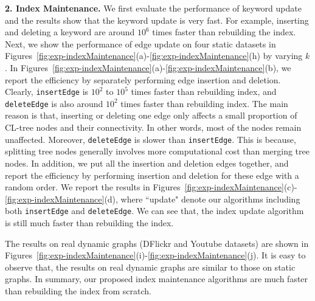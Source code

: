 {\color{blue}
\textbf{2. Index Maintenance.}
We first evaluate the performance of keyword update and the results show that the keyword update is very fast. For example, inserting and deleting a keyword are around $10^6$ times faster than rebuilding the index.
Next, we show the performance of edge update on four static datasets in Figures~\ref{fig:exp-indexMaintenance}(a)-\ref{fig:exp-indexMaintenance}(h) by varying $k$.
In Figures~\ref{fig:exp-indexMaintenance}(a)-\ref{fig:exp-indexMaintenance}(b), we report the efficiency by separately performing edge insertion and deletion. Clearly, {\tt insertEdge} is $10^2$ to $10^5$ times faster than rebuilding index,
and {\tt deleteEdge} is also around $10^2$ times faster than rebuilding index.
The main reason is that, inserting or deleting one edge only affects a small proportion of CL-tree nodes and their connectivity.
In other words, most of the nodes remain unaffected.
Moreover, {\tt deleteEdge} is slower than {\tt insertEdge}. This is because, splitting tree nodes generally involves more computational cost than merging tree nodes.
In addition, we put all the insertion and deletion edges together, and report the efficiency by performing insertion and deletion for these edge with a random order. We report the results in Figures~\ref{fig:exp-indexMaintenance}(c)-\ref{fig:exp-indexMaintenance}(d),
where ``update" denote our algorithms including both {\tt insertEdge} and {\tt deleteEdge}.
We can see that, the index update algorithm is still much faster than rebuilding the index.

The results on real dynamic graphs (DFlickr and Youtube datasets) are shown in Figures~\ref{fig:exp-indexMaintenance}(i)-\ref{fig:exp-indexMaintenance}(j).
It is easy to observe that, the results on real dynamic graphs are similar to those on static graphs.
In summary, our proposed index maintenance algorithms are much faster than rebuilding the index from scratch.

}
